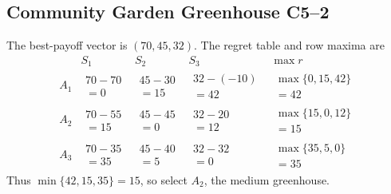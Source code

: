\subsection{Community Garden Greenhouse \hfill C5--2}
The best-payoff vector is $(70,45,32)$. The regret table and row maxima are
\[
\begin{array}{c|ccc|c}
 &S_1&S_2&S_3&\max r\\ \hline
A_1&\begin{gathered}70-70\\=0\end{gathered}&\begin{gathered}45-30\\=15\end{gathered}&\begin{gathered}32-(-10)\\=42\end{gathered}&\begin{gathered}\max\{0,15,42\}\\=42\end{gathered}\\[6pt]
A_2&\begin{gathered}70-55\\=15\end{gathered}&\begin{gathered}45-45\\=0\end{gathered}&\begin{gathered}32-20\\=12\end{gathered}&\begin{gathered}\max\{15,0,12\}\\=15\end{gathered}\\[6pt]
A_3&\begin{gathered}70-35\\=35\end{gathered}&\begin{gathered}45-40\\=5\end{gathered}&\begin{gathered}32-32\\=0\end{gathered}&\begin{gathered}\max\{35,5,0\}\\=35\end{gathered}
\end{array}
\]
Thus $\min\{42,15,35\}=15$, so select $\boxed{A_2}$, the medium greenhouse.

